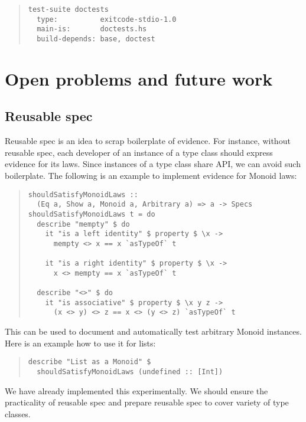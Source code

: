 \documentclass[preprint]{sigplanconf}
\begin{document}
\begin{quote}
\small
\begin{verbatim}
test-suite doctests
  type:          exitcode-stdio-1.0
  main-is:       doctests.hs
  build-depends: base, doctest
\end{verbatim}
\end{quote}

\section{Open problems and future work}

\subsection{Reusable spec}

Reusable spec is an idea to scrap boilerplate of evidence.
For instance, without reusable spec,
each developer of an instance of a type class should
express evidence for its laws.
Since instances of a type class share API,
we can avoid such boilerplate.
The following is an example to implement
evidence for Monoid laws:

\begin{quote}
\small
\begin{verbatim}
shouldSatisfyMonoidLaws ::
  (Eq a, Show a, Monoid a, Arbitrary a) => a -> Specs
shouldSatisfyMonoidLaws t = do
  describe "mempty" $ do
    it "is a left identity" $ property $ \x ->
      mempty <> x == x `asTypeOf` t

    it "is a right identity" $ property $ \x ->
      x <> mempty == x `asTypeOf` t

  describe "<>" $ do
    it "is associative" $ property $ \x y z ->
      (x <> y) <> z == x <> (y <> z) `asTypeOf` t
\end{verbatim}
\end{quote}

\noindent This can be used to document and automatically test
arbitrary Monoid instances.
Here is an example how to use it for lists:

\begin{quote}
\small
\begin{verbatim}
describe "List as a Monoid" $
  shouldSatisfyMonoidLaws (undefined :: [Int])
\end{verbatim}
\end{quote}

\noindent We have already implemented this experimentally.
We should ensure the practicality of reusable spec and
prepare reusable spec to cover variety of type classes.
\end{document}
